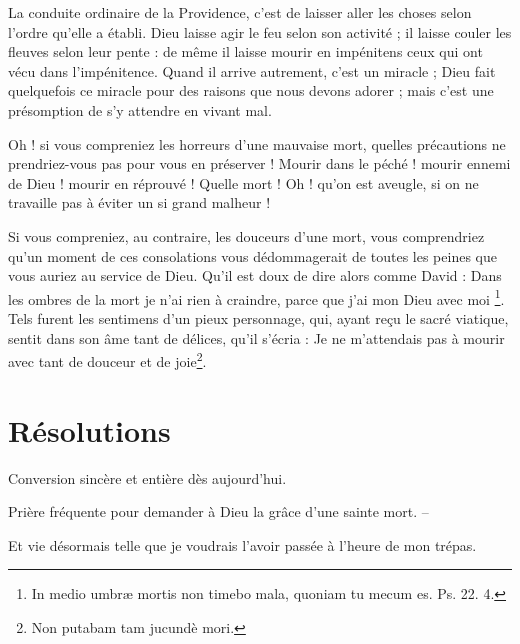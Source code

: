 \documentclass[instructions.tex]{subfiles}
\begin{document}
La conduite ordinaire de la Providence, c’est de laisser aller les choses selon l’ordre qu’elle a établi. Dieu laisse agir le feu selon son activité ; il laisse couler les fleuves selon leur pente : de même il laisse mourir en impénitens ceux qui ont vécu dans l’impénitence. Quand il arrive autrement, c’est un miracle ; Dieu fait quelquefois ce miracle pour des raisons que nous devons adorer ; mais c’est une présomption de s’y attendre en vivant mal.
 
Oh ! si vous compreniez les horreurs d’une mauvaise mort, quelles précautions ne prendriez-vous pas pour vous en préserver ! Mourir dans le péché ! mourir ennemi de Dieu ! mourir en réprouvé ! Quelle mort ! Oh ! qu’on est aveugle, si on ne travaille pas à éviter un si grand malheur !
 
Si vous compreniez, au contraire, les douceurs d’une mort, vous comprendriez qu’un moment de ces consolations vous dédommagerait de toutes les peines que vous auriez au service de Dieu. Qu’il est doux de dire alors comme David : Dans les ombres de la mort je n’ai rien à craindre, parce que j’ai mon Dieu avec moi \footnote{In medio umbræ mortis non timebo mala, quoniam tu mecum es. Ps. 22. 4.}. Tels furent les sentimens d’un pieux personnage, qui, ayant reçu le sacré viatique, sentit dans son âme tant de délices, qu’il s’écria : Je ne m’attendais pas à mourir avec tant de douceur et de joie\footnote{ Non putabam tam jucundè mori.}.
 
\section{Résolutions}
 
\primo Conversion sincère et entière dès aujourd’hui. 

\secundo Prière fréquente pour demander à Dieu la grâce d’une sainte mort. --

\tertio Et vie désormais telle que je voudrais l’avoir passée à l’heure de mon trépas. 

 
\end{document}
